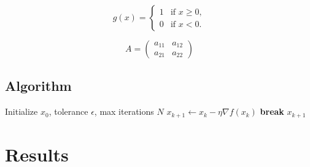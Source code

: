 \documentclass[12pt, letterpaper]{article}
\begin{document}
\begin{equation}
    g(x) =
    \begin{cases}
        1 & \text{if } x \geq 0, \\
        0 & \text{if } x < 0.
    \end{cases}
\end{equation}

\begin{equation}
    A =
    \begin{pmatrix}
        a_{11} & a_{12} \\
        a_{21} & a_{22}
    \end{pmatrix}
\end{equation}

\subsection{Algorithm}
\begin{algorithm}[H]
    \caption{Example iterative update}
    \label{alg:example}
    \begin{algorithmic}[1]
        \State Initialize $x_0$, tolerance $\epsilon$, max iterations $N$
            \State $x_{k+1} \gets x_k - \eta \nabla f(x_k)$
                \State \textbf{break}
            \EndIf
        \EndFor
        \State \Return $x_{k+1}$
    \end{algorithmic}
\end{algorithm}

\section{Results}

%
\end{document}
